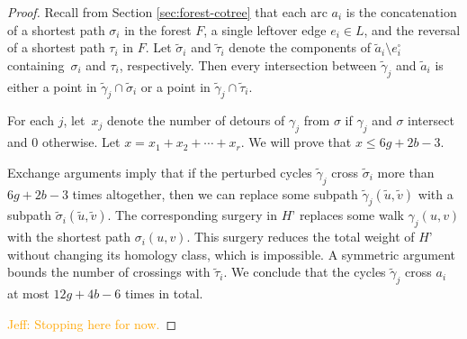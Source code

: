 \documentclass[letterpaper,review]{siamart190516}
\def\modified#1{\color{blue}#1 \color{black}}
\def\jnote#1{\textcolor{orange}{Jeff: #1}}
\begin{document}
\begin{proof}
Recall from Section \ref{sec:forest-cotree} that each arc $a_i$ is the concatenation of a shortest path $\sigma_i$ in the forest $F$, a single leftover edge $e_i\in L$, and the reversal of a shortest path $\tau_i$ in $F$.  Let $\tilde\sigma_i$ and $\tilde\tau_i$ denote the components of $\tilde{a}_i \setminus e_i^\square$ containing~$\sigma_i$ and $\tau_i$, respectively.  Then every intersection between $\tilde\gamma_j$ and $\tilde{a}_i$ is either a point in $\tilde\gamma_j\cap\tilde\sigma_i$ or a point in $\tilde\gamma_j\cap\tilde\tau_i$.


For each $j$, let~$x_j$ denote the number of detours of \(\gamma_j\) from $\sigma$ if \(\gamma_j\)
and \(\sigma\) intersect and \(0\) otherwise.
Let $x = x_1 + x_2 + \cdots + x_r$.
We will prove that $x\le 6g+2b-3$.




\modified{
Exchange arguments imply that if the perturbed cycles $\tilde\gamma_j$ cross $\tilde\sigma_i$ more than $6g+2b-3$ times altogether, then we can replace some subpath $\tilde\gamma_j(\tilde{u},\tilde{v})$ with a subpath $\tilde\sigma_i(\tilde{u},\tilde{v})$.  The corresponding surgery in $H’$ replaces some walk $\gamma_j(u,v)$ with the shortest path $\sigma_i(u,v)$.  This surgery reduces the total weight of $H’$ without changing its homology class, which is impossible.  A symmetric  argument bounds the number of crossings with $\tilde\tau_i$.  We conclude that the cycles $\tilde\gamma_j$ cross $a_i$ at most $12g+4b-6$ times in total.
}

\jnote{Stopping here for now.}


\end{proof}
\end{document}
